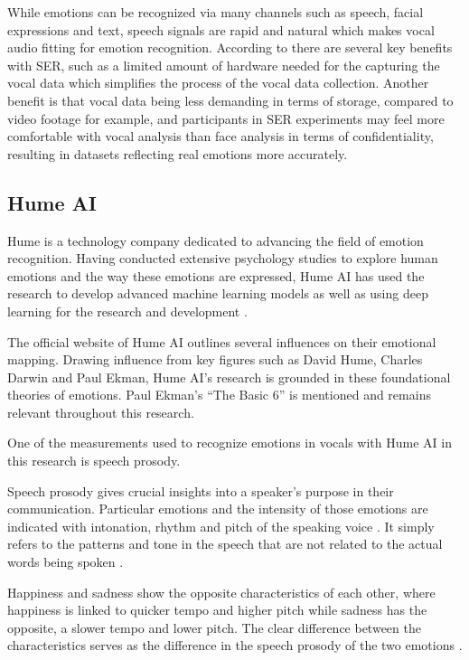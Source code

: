 While emotions can be recognized via many channels such as speech, facial expressions and text, speech signals are rapid and natural which makes vocal audio fitting for emotion recognition. According to \textcite{LGENSNMEZ2024} there are several key benefits with SER, such as a limited amount of hardware needed for the capturing the vocal data which simplifies the process of the vocal data collection. Another benefit is that vocal data being less demanding in terms of storage, compared to video footage for example, and participants in SER experiments may feel more comfortable with vocal analysis than face analysis in terms of confidentiality, resulting in datasets reflecting real emotions more accurately.

\subsection{Hume AI }

Hume is a technology company dedicated to advancing the field of emotion recognition. Having conducted extensive psychology studies to explore human emotions and the way these emotions are expressed, Hume AI has used the research to develop advanced machine learning models \autocite{HumeAi-aboutScience} as well as using deep learning for the research and development \autocite{Brooks2023}.

The official website of Hume AI outlines several influences on their emotional mapping. Drawing influence from key figures such as David Hume, Charles Darwin and Paul Ekman, Hume AI’s research is grounded in these foundational theories of emotions. Paul Ekman’s “The Basic 6” is mentioned \autocite{HumeAI-AboutHume} and remains relevant throughout this research. 

One of the measurements used to recognize emotions in vocals with Hume AI in this research is speech prosody. 

Speech prosody gives crucial insights into a speaker’s purpose in their communication. Particular emotions and the intensity of those emotions are indicated with intonation, rhythm and pitch of the speaking voice \autocites{Thompson2004}{Tomasello2022}. It simply refers to the patterns and tone in the speech that are not related to the actual words being spoken \autocite{Cowen2019}.

Happiness and sadness show the opposite characteristics of each other, where happiness is linked to quicker tempo and higher pitch while sadness has the opposite, a slower tempo and lower pitch. The clear difference between the characteristics serves as the difference in the speech prosody of the two emotions \autocite{Thompson2004}. 

